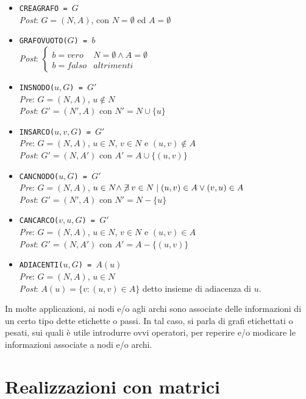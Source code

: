 \documentclass[12pt]{report}
\begin{document}
   	\begin{itemize}
   		\item \texttt{CREAGRAFO = $G$} \\
   		\quad \textit{Post}: $G = (N, A)$, con $N = \emptyset$ ed $A = \emptyset$
   		\item \texttt{GRAFOVUOTO($G$) = $b$} \\
   		\textit{Post}: $\begin{cases}
   			b = vero & N = \emptyset \wedge A = \emptyset \\
   			b = falso & altrimenti
   		\end{cases}$
   		\item \texttt{INSNODO($u, G$) = $G'$} \\
   		\quad \textit{Pre}: $G = (N, A)$, $u \notin N$ \\
   		\quad \textit{Post}: $G' = (N', A)$ con $N'= N\cup \{u\}$
   		\item \texttt{INSARCO($u, v, G$) = $G'$} \\
   		\quad \textit{Pre}: $G = (N, A)$, $u \in N$, $v \in N$ e $(u, v) \notin A$ \\
   		\quad \textit{Post}: $G' = (N, A')$ con $A'= A \cup \{(u, v)\}$
   		\item \texttt{CANCNODO($u, G$) = $G'$} \\
   		\quad \textit{Pre}: $G = (N, A)$, $u \in N \wedge \centernot{\exists}v \in N \mid (u, v) \in A \vee (v, u) \in A$ \\
   		\quad \textit{Post}: $G' = (N', A)$ con $N'= N - \{u\}$
   		\item \texttt{CANCARCO($v, u, G$) = $G'$} \\
   		\quad \textit{Pre}: $G = (N, A)$, $u \in N$, $v \in N$ e $(u, v) \in A$ \\
   		\quad \textit{Post}: $G' = (N, A')$ con $A'= A - \{(u, v)\}$
   		\item \texttt{ADIACENTI($u, G$) = $A(u)$} \\
   		\quad \textit{Pre}: $G = (N, A)$, $u \in N$ \\
   		\quad \textit{Post}: $A(u) = \{v: (u, v) \in A\}$ detto insieme di adiacenza di $u$.
   	\end{itemize}
   	In molte applicazioni, ai nodi e/o agli archi sono associate delle informazioni di un certo tipo dette etichette o passi. In tal caso, si parla di grafi etichettati o pesati, sui quali è utile introdurre ovvi operatori, per reperire e/o modicare le informazioni associate a nodi e/o archi.
   	\section{Realizzazioni con matrici}
\end{document}
